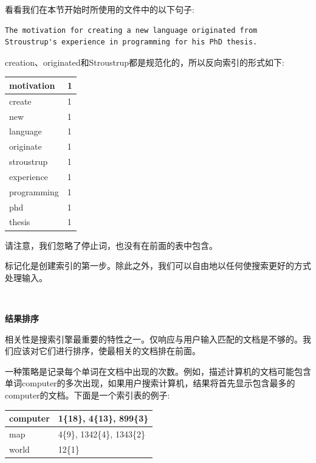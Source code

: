 看看我们在本节开始时所使用的文件中的以下句子: \par

\begin{lstlisting}[caption={}]
The motivation for creating a new language originated from Stroustrup's experience in programming for his PhD thesis.
\end{lstlisting}

creation、originated和Stroustrup都是规范化的，所以反向索引的形式如下: \par

\begin{table}[h]
	\begin{tabularx}{\textwidth}{|X|X|}
		\hline
		motivation & 1 \\
		\hline
		create & 1 \\
		\hline
		new & 1 \\
		\hline
		language & 1 \\
		\hline
		originate & 1 \\
		\hline
		stroustrup & 1 \\
		\hline
		experience & 1 \\
		\hline
		programming & 1 \\
		\hline
		phd & 1 \\
		\hline
		thesis & 1 \\
		\hline
	\end{tabularx}
\end{table}

请注意，我们忽略了停止词，也没有在前面的表中包含。 \par
标记化是创建索引的第一步。除此之外，我们可以自由地以任何使搜索更好的方式处理输入。 \par

\noindent\textbf{}\ \par
\textbf{结果排序} \ \par
相关性是搜索引擎最重要的特性之一。仅响应与用户输入匹配的文档是不够的。我们应该对它们进行排序，使最相关的文档排在前面。 \par
一种策略是记录每个单词在文档中出现的次数。例如，描述计算机的文档可能包含单词computer的多次出现，如果用户搜索计算机，结果将首先显示包含最多的computer的文档。下面是一个索引表的例子: \par

\begin{table}[h]
	\begin{tabularx}{\textwidth}{|X|X|}
		\hline
		computer & 1\{18\}, 4\{13\}, 899\{3\} \\
		\hline
		map & 4\{9\}, 1342\{4\}, 1343\{2\} \\
		\hline
		world & 12\{1\} \\
		\hline
	\end{tabularx}
\end{table}

